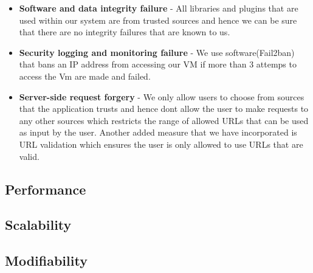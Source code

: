 \documentclass[12pt]{article}
\begin{document}
\begin{itemize}
    \item \textbf{Software and data integrity failure} - All libraries and plugins that are used within our system are from trusted sources and hence we can be sure that there are no integrity failures that are known to us.
    \item \textbf{Security logging and monitoring failure} - We use software(Fail2ban) that bans an IP address from accessing our VM if more than 3 attemps to access the Vm are made and failed.
    \item \textbf{Server-side request forgery} - We only allow users to choose from sources that the application trusts and hence dont allow the user to make requests to any other sources which restricts the range of allowed URLs that can be used as input by the user. Another added measure that we have incorporated is URL validation which ensures the user is only allowed to use URLs that are valid.
\end{itemize}
\newpage
\subsection{Performance}
\subsection{Scalability}
\subsection{Modifiability}

\newpage
\end{document}
